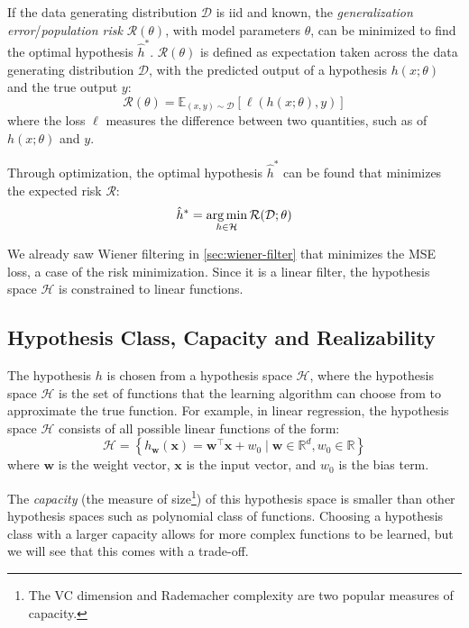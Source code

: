 If the data generating distribution $\mathcal{D}$ is \gls{iid} and known, the \textit{generalization error}/\textit{population risk} $\mathcal{R}(\theta)$, with model parameters $\theta$, can be minimized to find the optimal hypothesis $\hat{h}^*$. $\mathcal{R}(\theta)$ is defined as expectation taken across the data generating distribution $\mathcal{D}$, with the predicted output of a hypothesis $h(x; \theta)$ and the true output $y$:
\begin{equation}
    \mathcal{R}(\theta) = \mathbb{E}_{(x, y) \sim \mathcal{D}} \left[ \ell(h(x; \theta), y) \right]
\end{equation}
where the loss $\ell$ measures the difference between two quantities, such as of $h(x; \theta)$ and $y$.

Through optimization, the optimal hypothesis $\hat{h}^*$ can be found that minimizes the expected risk $\mathcal{R}$:
\begin{equation}
    \hat{h}^* = \operatorname*{arg\,min}_{h \in \mathcal{H}} \mathcal{R}(\mathcal{D}; \theta)
\end{equation}

We already saw Wiener filtering in \cref{sec:wiener-filter} that minimizes the \gls{MSE} loss, a case of the risk minimization. Since it is a linear filter, the hypothesis space $\mathcal{H}$ is constrained to linear functions.

\subsection{Hypothesis Class, Capacity and Realizability}
The hypothesis $h$ is chosen from a hypothesis space $\mathcal{H}$, where the hypothesis space $\mathcal{H}$ is the set of functions that the learning algorithm can choose from to approximate the true function. 
For example, in linear regression, the hypothesis space $\mathcal{H}$ consists of all possible linear functions of the form:
\begin{equation}\label{eq:linear-hypothesis}
   \mathcal{H} =  \left\{ h_{\mathbf{w}}(\mathbf{x}) = \mathbf{w}^\top \mathbf{x} + w_0 \mid \mathbf{w} \in \mathbb{R}^d, w_0 \in \mathbb{R} \right\}
\end{equation}
where $\mathbf{w}$ is the weight vector, $\mathbf{x}$ is the input vector, and $w_0$ is the bias term.

The \textit{capacity} (the measure of size\footnote{The VC dimension and Rademacher complexity are two popular measures of capacity.}) of this hypothesis space is smaller than other hypothesis spaces such as polynomial class of functions. Choosing a hypothesis class with a larger capacity allows for more complex functions to be learned, but we will see that this comes with a trade-off.


